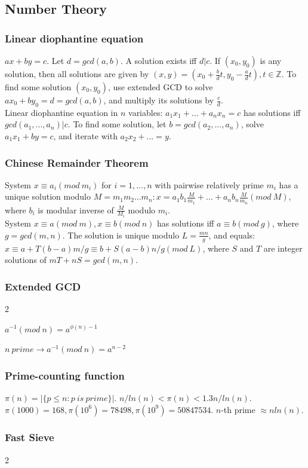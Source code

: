 \documentclass[a4paper,12pt]{article}
\newcommand\includefile[4]{
  \subsubsection{#2}
  \begin{multicols}{2}
    
  \end{multicols}
}
\begin{document}
\subsection{Number Theory}
\subsubsection{Linear diophantine equation}
$ax + by = c$. Let $d = gcd(a,b)$. A solution exists iff $d|c$. If $(x_0, y_0)$ is any solution, then all solutions are given by $(x, y) = (x_0 + \frac{b}{d}t, y_0 - \frac{a}{d}t), t \in \mathbb{Z}$. To find some solution $(x_0, y_0)$,
use extended GCD to solve $ax_0 + by_0 = d = gcd(a, b)$, and multiply its solutions by $\frac{c}{d}$.\\
Linear diophantine equation in $n$ variables: $a_1x_1 + ... + a_nx_n = c$ has solutions iff $gcd(a_1, ..., a_n) | c$. To find some solution, let $b = gcd(a_2, ..., a_n)$, solve $a_1x_1 + by = c$, and iterate with $a_2x_2 + ... = y$.

\subsubsection{Chinese Remainder Theorem}
System $x \equiv a_i (mod\ m_i)$ for $i = 1, ..., n$ with pairwise relatively prime $m_i$ has a unique solution modulo $M = m_1m_2...m_n : x = a_1b_1\frac{M}{m_1} + ... + a_nb_n\frac{M}{m_n} (mod\ M)$, where $b_i$ is modular inverse of $\frac{M}{M_i}$ modulo $m_i$.\\
System $x \equiv a (mod\ m), x \equiv b (mod\ n)$ has solutions iff $a \equiv b (mod\ g)$, where $g = gcd(m,n)$. The solution is unique modulo $L = \frac{mn}{g}$, and equals: $x \equiv a + T(b-a)m/g \equiv b + S(a-b)n/g (mod\ L)$, where $S$ and $T$ are integer solutions of $mT + nS = gcd(m,n)$.

\newpage
\includefile{c++}{Extended GCD}{meh}{gcdext.cpp}

$a^{-1} (mod\ n) = a^{\phi(n)-1}$

$n\ prime \rightarrow a^{-1} (mod\ n) = a^{n-2}$

\subsubsection{Prime-counting function}
$\pi(n) = |\{p \leq n : p\ is\ prime\}|$. $n / ln(n) < \pi(n) < 1.3n / ln(n)$. $\pi(1000) = 168, \pi(10^6) = 78498, \pi(10^9) = 50 847 534$. $n$-th prime $\approx n ln(n)$.

\newpage
\includefile{c++}{Fast Sieve}{math}{sieve.cpp}
\end{document}

